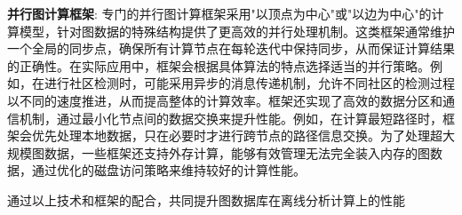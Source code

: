 \textbf{并行图计算框架}: 专门的并行图计算框架采用"以顶点为中心"或"以边为中心"的计算模型，针对图数据的特殊结构提供了更高效的并行处理机制。这类框架通常维护一个全局的同步点，确保所有计算节点在每轮迭代中保持同步，从而保证计算结果的正确性。在实际应用中，框架会根据具体算法的特点选择适当的并行策略。例如，在进行社区检测时，可能采用异步的消息传递机制，允许不同社区的检测过程以不同的速度推进，从而提高整体的计算效率。框架还实现了高效的数据分区和通信机制，通过最小化节点间的数据交换来提升性能。例如，在计算最短路径时，框架会优先处理本地数据，只在必要时才进行跨节点的路径信息交换。为了处理超大规模图数据，一些框架还支持外存计算，能够有效管理无法完全装入内存的图数据，通过优化的磁盘访问策略来维持较好的计算性能。

通过以上技术和框架的配合，共同提升图数据库在离线分析计算上的性能
\clearpage %